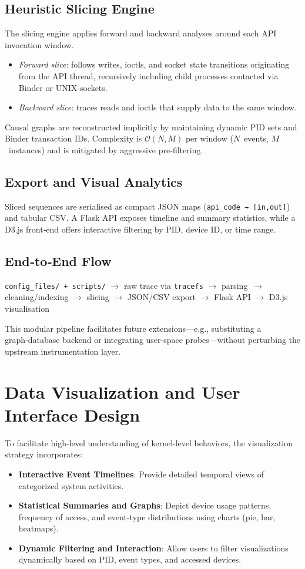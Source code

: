 \documentclass[a4paper,12pt]{report}
\begin{document}
\subsection{Heuristic Slicing Engine}
The slicing engine applies forward and backward analyses around each API invocation window.
\begin{itemize}
\item \emph{Forward slice}: follows writes, ioctls, and socket state transitions originating from the API thread, recursively including child processes contacted via Binder or UNIX sockets.
\item \emph{Backward slice}: traces reads and ioctls that supply data to the same window.
\end{itemize}
Causal graphs are reconstructed implicitly by maintaining dynamic PID sets and Binder transaction IDs. Complexity is $\mathcal{O}(N,M)$ per window ($N$ events, $M$ instances) and is mitigated by aggressive pre‑filtering.

\subsection{Export and Visual Analytics}
Sliced sequences are serialised as compact JSON maps (\texttt{api\_code → [in,out]}) and tabular CSV. A Flask API exposes timeline and summary statistics, while a D3.js front‑end offers interactive filtering by PID, device ID, or time range.

\subsection{End‑to‑End Flow}
\begin{center}
\texttt{config\_files/ + scripts/} $\rightarrow$ raw trace via \texttt{tracefs} $\rightarrow$ parsing $\rightarrow$ cleaning/indexing $\rightarrow$ slicing $\rightarrow$ JSON/CSV export $\rightarrow$ Flask API $\rightarrow$ D3.js visualisation
\end{center}


This modular pipeline facilitates future extensions—e.g., substituting a graph‑database backend or integrating user‑space probes—without perturbing the upstream instrumentation layer.


\section{Data Visualization and User Interface Design}
To facilitate high-level understanding of kernel-level behaviors, the visualization strategy incorporates:
\begin{itemize}
\item \textbf{Interactive Event Timelines}: Provide detailed temporal views of categorized system activities.
\item \textbf{Statistical Summaries and Graphs}: Depict device usage patterns, frequency of access, and event-type distributions using charts (pie, bar, heatmaps).
\item \textbf{Dynamic Filtering and Interaction}: Allow users to filter visualizations dynamically based on PID, event types, and accessed devices.
\end{itemize}
\end{document}
